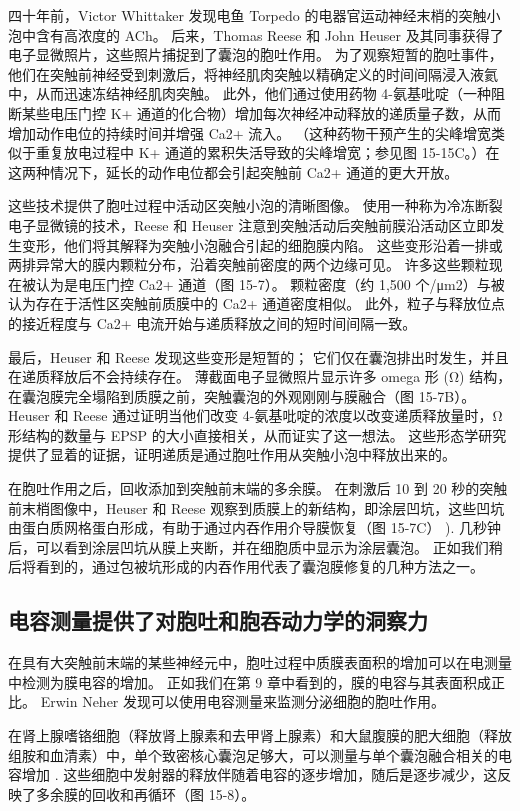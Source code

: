 四十年前，Victor Whittaker 发现电鱼 Torpedo 的电器官运动神经末梢的突触小泡中含有高浓度的 ACh。 后来，Thomas Reese 和 John Heuser 及其同事获得了电子显微照片，这些照片捕捉到了囊泡的胞吐作用。 为了观察短暂的胞吐事件，他们在突触前神经受到刺激后，将神经肌肉突触以精确定义的时间间隔浸入液氦中，从而迅速冻结神经肌肉突触。 此外，他们通过使用药物 4-氨基吡啶（一种阻断某些电压门控 K+ 通道的化合物）增加每次神经冲动释放的递质量子数，从而增加动作电位的持续时间并增强 Ca2+ 流入。 （这种药物干预产生的尖峰增宽类似于重复放电过程中 K+ 通道的累积失活导致的尖峰增宽；参见图 15-15C。）在这两种情况下，延长的动作电位都会引起突触前 Ca2+ 通道的更大开放。

这些技术提供了胞吐过程中活动区突触小泡的清晰图像。 使用一种称为冷冻断裂电子显微镜的技术，Reese 和 Heuser 注意到突触活动后突触前膜沿活动区立即发生变形，他们将其解释为突触小泡融合引起的细胞膜内陷。 这些变形沿着一排或两排异常大的膜内颗粒分布，沿着突触前密度的两个边缘可见。 许多这些颗粒现在被认为是电压门控 Ca2+ 通道（图 15-7）。 颗粒密度（约 1,500 个/μm2）与被认为存在于活性区突触前质膜中的 Ca2+ 通道密度相似。 此外，粒子与释放位点的接近程度与 Ca2+ 电流开始与递质释放之间的短时间间隔一致。

最后，Heuser 和 Reese 发现这些变形是短暂的； 它们仅在囊泡排出时发生，并且在递质释放后不会持续存在。 薄截面电子显微照片显示许多 omega 形 (Ω) 结构，在囊泡膜完全塌陷到质膜之前，突触囊泡的外观刚刚与膜融合（图 15-7B）。 Heuser 和 Reese 通过证明当他们改变 4-氨基吡啶的浓度以改变递质释放量时，Ω 形结构的数量与 EPSP 的大小直接相关，从而证实了这一想法。 这些形态学研究提供了显着的证据，证明递质是通过胞吐作用从突触小泡中释放出来的。

在胞吐作用之后，回收添加到突触前末端的多余膜。 在刺激后 10 到 20 秒的突触前末梢图像中，Heuser 和 Reese 观察到质膜上的新结构，即涂层凹坑，这些凹坑由蛋白质网格蛋白形成，有助于通过内吞作用介导膜恢复（图 15-7C） ). 几秒钟后，可以看到涂层凹坑从膜上夹断，并在细胞质中显示为涂层囊泡。 正如我们稍后将看到的，通过包被坑形成的内吞作用代表了囊泡膜修复的几种方法之一。

\subsection{电容测量提供了对胞吐和胞吞动力学的洞察力}
在具有大突触前末端的某些神经元中，胞吐过程中质膜表面积的增加可以在电测量中检测为膜电容的增加。 正如我们在第 9 章中看到的，膜的电容与其表面积成正比。 Erwin Neher 发现可以使用电容测量来监测分泌细胞的胞吐作用。

在肾上腺嗜铬细胞（释放肾上腺素和去甲肾上腺素）和大鼠腹膜的肥大细胞（释放组胺和血清素）中，单个致密核心囊泡足够大，可以测量与单个囊泡融合相关的电容增加 . 这些细胞中发射器的释放伴随着电容的逐步增加，随后是逐步减少，这反映了多余膜的回收和再循环（图 15-8）。

